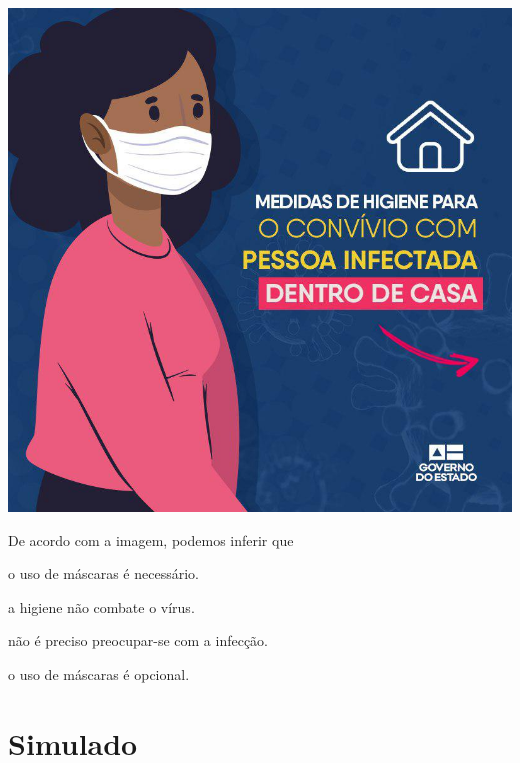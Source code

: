 \begin{minipage}{.5\textwidth}
\includegraphics[width=\textwidth]{./imgQ4PORT/media/image5.jpeg}

\end{minipage}
\hspace{.5cm}
\begin{minipage}{.5\textwidth}
De acordo com a imagem, podemos inferir que

\begin{escolha}
  \item o uso de máscaras é necessário.

  \item a higiene não combate o vírus.

  \item não é preciso preocupar-se com a infecção.

  \item o uso de máscaras é opcional.
\end{escolha}
\end{minipage}

\chapter[Simulado 4]{Simulado}

